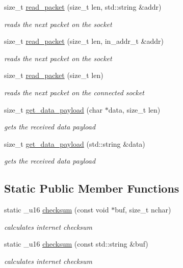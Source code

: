 \begin{CompactItemize}
size\_\-t \hyperlink{classsocketpp_1_1RawSocket_1564181b6422fb3918c419051b34ae2d}{read\_\-packet} (size\_\-t len, std::string \&addr)
\begin{CompactList}\small\item\em reads the next packet on the socket \item\end{CompactList}\item 
size\_\-t \hyperlink{classsocketpp_1_1RawSocket_08b8bec945928764f2d7ee11890b8625}{read\_\-packet} (size\_\-t len, in\_\-addr\_\-t \&addr)
\begin{CompactList}\small\item\em reads the next packet on the socket \item\end{CompactList}\item 
size\_\-t \hyperlink{classsocketpp_1_1RawSocket_ea48bec4596e2afc89adba2ccb13f6c8}{read\_\-packet} (size\_\-t len)
\begin{CompactList}\small\item\em reads the next packet on the connected socket \item\end{CompactList}\item 
size\_\-t \hyperlink{classsocketpp_1_1RawSocket_bd9631abfa5165ad4ed9e2a31640d1f0}{get\_\-data\_\-payload} (char $\ast$data, size\_\-t len)
\begin{CompactList}\small\item\em gets the received data payload \item\end{CompactList}\item 
size\_\-t \hyperlink{classsocketpp_1_1RawSocket_de47c63d60cba25d1ae82f242851610d}{get\_\-data\_\-payload} (std::string \&data)
\begin{CompactList}\small\item\em gets the received data payload \item\end{CompactList}\end{CompactItemize}
\subsection*{Static Public Member Functions}
\begin{CompactItemize}
\item 
static \_\-u16 \hyperlink{classsocketpp_1_1RawSocket_bb78ecebb5bd5ab5be4ee46d786fe5cd}{checksum} (const void $\ast$buf, size\_\-t nchar)
\begin{CompactList}\small\item\em calculates internet checksum \item\end{CompactList}\item 
static \_\-u16 \hyperlink{classsocketpp_1_1RawSocket_67af2c9f3bc37146b54fc9fb69c0dd8d}{checksum} (const std::string \&buf)
\begin{CompactList}\small\item\em calculates internet checksum \item\end{CompactList}\end{CompactItemize}
